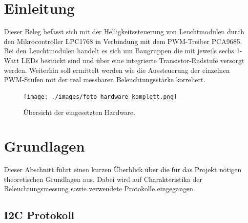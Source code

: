\documentclass[a4paper,12pt]{scrartcl}
\renewcommand{\headrulewidth}{0pt}
\begin{document}
\fancypagestyle{plain}{%
  \fancyhf{}%
  \renewcommand{\headrulewidth}{0pt}%
  \renewcommand{\footrulewidth}{0pt}%
}


\tableofcontents

\clearpage

\onehalfspacing

\pagestyle{headings}	%

\clearpage
\listoffigures

\clearpage
\section{Einleitung}
\pagestyle{empty}
Dieser Beleg befasst sich mit der Helligkeitssteuerung von Leuchtmodulen durch den Mikrocontroller LPC1768 in Verbindung mit dem PWM-Treiber PCA9685. Bei den
Leuchtmodulen handelt es sich um Baugruppen die mit jeweils sechs 1-Watt LEDs best\"uckt sind und \"uber eine integrierte Transistor-Endstufe versorgt
werden.
Weiterhin soll ermittelt werden wie die Aussteuerung der einzelnen PWM-Stufen mit der real messbaren Beleuchtungsst\"arke korreliert. 
\begin{figure}[htb]
\begin{center}
  \texttt{[image: ./images/foto\_hardware\_komplett.png]}
\end{center}
\caption[\"Ubersicht der eingesetzten Hardware, Quelle: Autor, verwendete Symbole unterliegen der
GPL]{\label{fotohwuebersicht}\"Ubersicht der eingesetzten Hardware.}
\end{figure}

\clearpage
\section{Grundlagen}

Dieser Abschnitt führt einen kurzen \"Uberblick \"uber die für das Projekt nötigen theoretischen Grundlagen aus. Dabei wird auf Charakteristika der
Beleuchtungsmessung sowie verwendete Protokolle eingegangen.

\subsection{I2C Protokoll}
\end{document}
